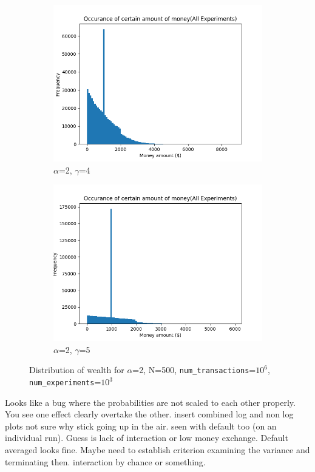 \documentclass[12pt]{article} %
\begin{document}
\begin{figure}[h!]
\begin{subfigure}{\scaleTextWidth\textwidth}
		\includegraphics[scale=\scaleResultsA]{a2g4.png}
		\caption{$\alpha$=2, $\gamma$=4}
		\label{fig:a2g4}
	\end{subfigure}
	\begin{subfigure}{\scaleTextWidth\textwidth}
		\includegraphics[scale=\scaleResultsA]{a2g5.png}
		\caption{$\alpha$=2, $\gamma$=5}
		\label{fig:a2g5}
	\end{subfigure}
	\caption{Distribution of wealth for $\alpha$=2, N=500,
	\texttt{num\_transactions}=$10^6$, \texttt{num\_experiments}=$10^3$}
\end{figure}

Looks like a bug where the probabilities are not scaled to each other properly.
You see one effect clearly overtake the other.
insert combined log and non log plots
not sure why stick going up in the air. seen with default too (on an individual
run). Guess is lack of interaction or low money exchange. Default averaged
looks fine. Maybe need to establish criterion examining the variance and
terminating then.
interaction by chance or something.
\end{document}
